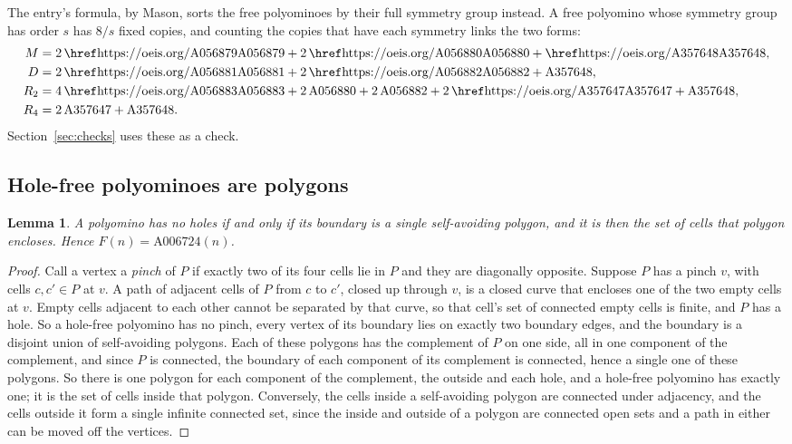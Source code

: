 \documentclass[11pt]{a000104}
\numberwithin{equation}{section}
\newtheorem{lemma}{Lemma}[section]
\begin{document}
The entry's formula, by Mason, sorts the free polyominoes by their full symmetry group instead.
A free polyomino whose symmetry group has order $s$ has $8/s$ fixed copies, and counting the copies that have each symmetry links the two forms:
\begin{equation}\label{eq:exact}
\begin{aligned}
  M &= 2\,\text{\oeis{A056879}} + 2\,\text{\oeis{A056880}} + \text{\oeis{A357648}}, \\
  D &= 2\,\text{\oeis{A056881}} + 2\,\text{\oeis{A056882}} + \text{A357648}, \\
  R_2 &= 4\,\text{\oeis{A056883}} + 2\,\text{A056880} + 2\,\text{A056882} + 2\,\text{\oeis{A357647}} + \text{A357648}, \\
  R_4 &= 2\,\text{A357647} + \text{A357648}.
\end{aligned}
\end{equation}
Section~\ref{sec:checks} uses these as a check.

\subsection{Hole-free polyominoes are polygons}

\begin{lemma}\label{lem:polygon}
A polyomino has no holes if and only if its boundary is a single self-avoiding polygon, and it is then the set of cells that polygon encloses.
Hence $F(n) = \text{A006724}(n)$.
\end{lemma}

\begin{proof}
Call a vertex a \emph{pinch} of $P$ if exactly two of its four cells lie in $P$ and they are diagonally opposite.
Suppose $P$ has a pinch $v$, with cells $c, c' \in P$ at $v$.
A path of adjacent cells of $P$ from $c$ to $c'$, closed up through $v$, is a closed curve that encloses one of the two empty cells at $v$.
Empty cells adjacent to each other cannot be separated by that curve, so that cell's set of connected empty cells is finite, and $P$ has a hole.
So a hole-free polyomino has no pinch, every vertex of its boundary lies on exactly two boundary edges, and the boundary is a disjoint union of self-avoiding polygons.
Each of these polygons has the complement of $P$ on one side, all in one component of the complement, and since $P$ is connected, the boundary of each component of its complement is connected, hence a single one of these polygons.
So there is one polygon for each component of the complement, the outside and each hole, and a hole-free polyomino has exactly one; it is the set of cells inside that polygon.
Conversely, the cells inside a self-avoiding polygon are connected under adjacency, and the cells outside it form a single infinite connected set, since the inside and outside of a polygon are connected open sets and a path in either can be moved off the vertices.
\end{proof}
\end{document}
